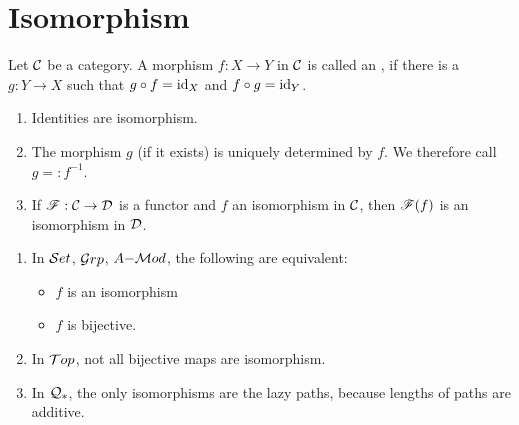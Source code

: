 \section{Isomorphism}
\begin{defn}
  Let $\mathcal{C}$ be a category. A morphism $f:X\to Y$ in $\mathcal{C}$ is called an , if there is a $g:Y\to X$ such that $g\circ f = \operatorname{id}_X$ and $f\circ g=\operatorname{id}_Y$.
\end{defn}
\begin{rem}
  \begin{enumerate}
    \item Identities are isomorphism.
    \item The morphism $g$ (\coms if it exists\come) is uniquely determined by $f$. We therefore call $g=: f^{-1}$.
    \item If $\mathscr{F}:\mathcal{C}\to \mathcal{D}$ is a functor and $f$ an isomorphism in $\mathcal{C}$, then $\mathscr{F}(f)$ is an isomorphism in $\mathcal{D}$.
  \end{enumerate}
\end{rem}
\begin{bsp}
  \begin{enumerate}
    \item In $\mathcal{S}et$, $\mathcal{G}rp$, $A\mathrm{-}\mathcal{M}od$, the following are equivalent:
    \begin{itemize}
      \item $f$ is an isomorphism
      \item $f$ is bijective.
    \end{itemize}
    \item In $\mathcal{T}op$, not all bijective maps are isomorphism.
    \item In $\mathcal{Q}_{\ast}$, the only isomorphisms are the lazy paths, \coms because lengths of paths are additive\come.
  \end{enumerate}
\end{bsp}
